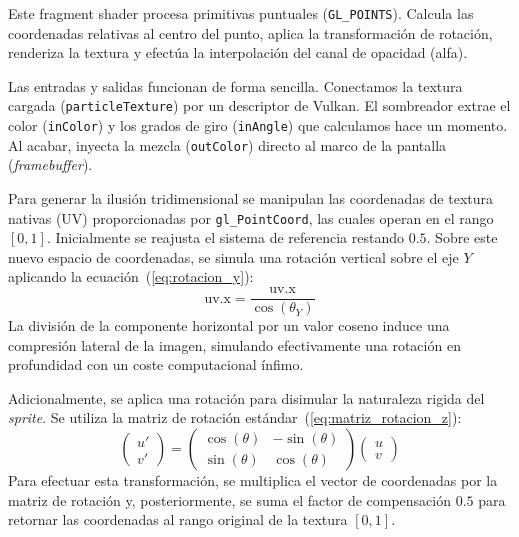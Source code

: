 Este fragment shader procesa primitivas puntuales (\texttt{GL\_POINTS}). Calcula las coordenadas relativas al centro del punto, aplica la transformación de rotación, renderiza la textura y efectúa la interpolación del canal de opacidad (alfa).

\vspace{3\baselineskip}
Las entradas y salidas funcionan de forma sencilla. Conectamos la textura cargada (\texttt{particleTexture}) por un descriptor de Vulkan. El sombreador extrae el color (\texttt{inColor}) y los grados de giro (\texttt{inAngle}) que calculamos hace un momento. Al acabar, inyecta la mezcla (\texttt{outColor}) directo al marco de la pantalla (\textit{framebuffer}).

Para generar la ilusión tridimensional se manipulan las coordenadas de textura nativas (UV) proporcionadas por \texttt{gl\_PointCoord}, las cuales operan en el rango $[0, 1]$. Inicialmente se reajusta el sistema de referencia restando $0.5$. Sobre este nuevo espacio de coordenadas, se simula una rotación vertical sobre el eje $Y$ aplicando la ecuación~(\ref{eq:rotacion_y}):
\begin{equation}
    \label{eq:rotacion_y}
    \text{uv.x} = \frac{\text{uv.x}}{\cos(\theta_Y)}
\end{equation}
La división de la componente horizontal por un valor coseno induce una compresión lateral de la imagen, simulando efectivamente una rotación en profundidad con un coste computacional ínfimo.

Adicionalmente, se aplica una rotación para disimular la naturaleza rigida del \textit{sprite}. Se utiliza la matriz de rotación estándar~(\ref{eq:matriz_rotacion_z}):
\begin{equation}
    \label{eq:matriz_rotacion_z}
    \begin{pmatrix} u' \\ v' \end{pmatrix} = \begin{pmatrix} \cos(\theta) & -\sin(\theta) \\ \sin(\theta) & \cos(\theta) \end{pmatrix} \begin{pmatrix} u \\ v \end{pmatrix}
\end{equation}
Para efectuar esta transformación, se multiplica el vector de coordenadas por la matriz de rotación y, posteriormente, se suma el factor de compensación $0.5$ para retornar las coordenadas al rango original de la textura $[0, 1]$.

